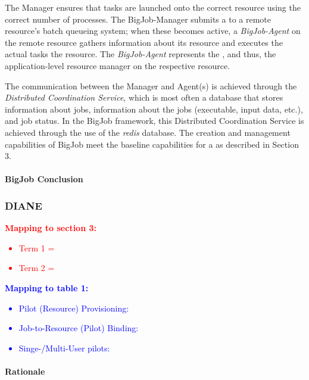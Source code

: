 \documentclass{sig-alternate}
\begin{document}
The Manager ensures that tasks are launched onto the correct resource
using the correct number of processes. The BigJob-Manager submits a
\pilot to a remote resource's batch queueing system; when these
\pilots becomes active, a \textit{BigJob-Agent} on the remote resource 
gathers information about its resource
and executes the actual tasks the resource. The \textit{BigJob-Agent}
represents the \pilotjob, and thus, the application-level resource
manager on the respective resource.
 
The communication between the Manager and Agent(s) is achieved through
the {\it Distributed Coordination Service}, which is most often a
database that stores information about jobs, information about the
jobs (executable, input data, etc.), and job status. In the BigJob framework,
this Distributed Coordination Service is achieved through the use
of the \textit{redis} database. 
The \pilot creation and management capabilities of BigJob meet 
the baseline capabilities for a \pilotjob as described in Section 3.


\paragraph{BigJob Conclusion}

\subsubsection{DIANE}

\textcolor{red}
{
\textbf{Mapping to section 3:}
\begin{itemize}
\item Term 1 =
\item Term 2 =
\end{itemize}
}

\textcolor{blue}
{
\textbf{Mapping to table 1:}
\begin{itemize}
\item Pilot (Resource) Provisioning:
\item Job-to-Resource (Pilot) Binding:
\item Singe-/Multi-User pilots:
\end{itemize}
}




\paragraph{Rationale}
\end{document}
